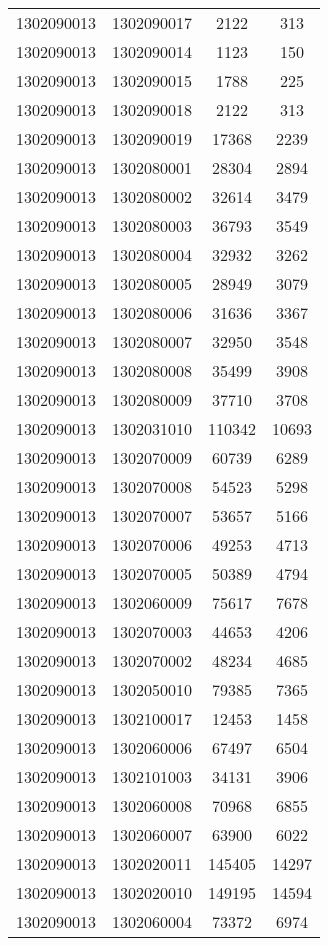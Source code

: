 \begin{longtable}[h]{llcc}
		1302090013 & 1302090017 & 2122 & 313\\
		1302090013 & 1302090014 & 1123 & 150\\
		1302090013 & 1302090015 & 1788 & 225\\
		1302090013 & 1302090018 & 2122 & 313\\
		1302090013 & 1302090019 & 17368 & 2239\\
		1302090013 & 1302080001 & 28304 & 2894\\
		1302090013 & 1302080002 & 32614 & 3479\\
		1302090013 & 1302080003 & 36793 & 3549\\
		1302090013 & 1302080004 & 32932 & 3262\\
		1302090013 & 1302080005 & 28949 & 3079\\
		1302090013 & 1302080006 & 31636 & 3367\\
		1302090013 & 1302080007 & 32950 & 3548\\
		1302090013 & 1302080008 & 35499 & 3908\\
		1302090013 & 1302080009 & 37710 & 3708\\
		1302090013 & 1302031010 & 110342 & 10693\\
		1302090013 & 1302070009 & 60739 & 6289\\
		1302090013 & 1302070008 & 54523 & 5298\\
		1302090013 & 1302070007 & 53657 & 5166\\
		1302090013 & 1302070006 & 49253 & 4713\\
		1302090013 & 1302070005 & 50389 & 4794\\
		1302090013 & 1302060009 & 75617 & 7678\\
		1302090013 & 1302070003 & 44653 & 4206\\
		1302090013 & 1302070002 & 48234 & 4685\\
		1302090013 & 1302050010 & 79385 & 7365\\
		1302090013 & 1302100017 & 12453 & 1458\\
		1302090013 & 1302060006 & 67497 & 6504\\
		1302090013 & 1302101003 & 34131 & 3906\\
		1302090013 & 1302060008 & 70968 & 6855\\
		1302090013 & 1302060007 & 63900 & 6022\\
		1302090013 & 1302020011 & 145405 & 14297\\
		1302090013 & 1302020010 & 149195 & 14594\\
		1302090013 & 1302060004 & 73372 & 6974\\

\end{longtable}

